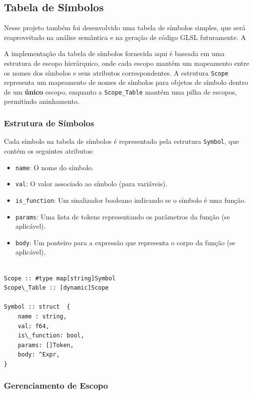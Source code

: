 \documentclass[english, 
               brazil, 
               bsc] %
               {dcomp-abntex2}
\begin{document}
\subsection{Tabela de Símbolos}

Nesse projeto também foi desenvolvido uma tabela de símbolos simples, que será reaproveitado na análise semântica e na geração de código GLSL futuramente. A

A implementação da tabela de símbolos fornecida aqui é baseada em uma estrutura de escopo hierárquico, onde cada escopo mantém um mapeamento entre os nomes dos símbolos e seus atributos correspondentes. A estrutura \texttt{Scope} representa um mapeamento de nomes de símbolos para objetos de símbolo dentro de um \textbf{único} escopo, enquanto a \texttt{Scope\_Table} mantém uma pilha de escopos, permitindo aninhamento.

\subsubsection{Estrutura de Símbolos}

Cada símbolo na tabela de símbolos é representado pela estrutura \texttt{Symbol}, que contém os seguintes atributos:
\begin{itemize}
    \item \texttt{name}: O nome do símbolo.
    \item \texttt{val}: O valor associado ao símbolo (para variáveis).
    \item \texttt{is\_function}: Um sinalizador booleano indicando se o símbolo é uma função.
    \item \texttt{params}: Uma lista de tokens representando os parâmetros da função (se aplicável).
    \item \texttt{body}: Um ponteiro para a expressão que representa o corpo da função (se aplicável).
\end{itemize}

\begin{lstlisting}

Scope :: #type map[string]Symbol
Scope\_Table :: [dynamic]Scope

Symbol :: struct  {
    name : string,
    val: f64,
    is\_function: bool,
    params: []Token,
    body: ^Expr,
}

\end{lstlisting}

\subsubsection{Gerenciamento de Escopo}
\end{document}
